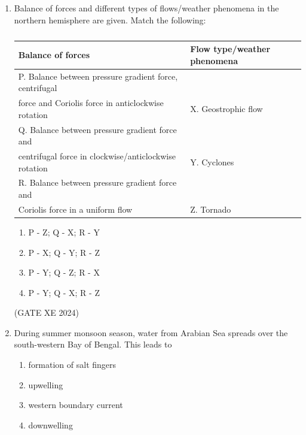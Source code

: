 \documentclass[12pt]{article}
\begin{document}
\begin{enumerate}
\begin{enumerate}
\item The lapse rate of environment below 5 km is -15 $^\circ$C km$^{-1}$  
\item The atmosphere is unstable above 5 km  
\item The chances of a deep convective cloud growth above 5 km are less  
\item The atmosphere is conditionally unstable below 5 km  
\end{enumerate}

(GATE XE 2024)

\item Balance of forces and different types of flows/weather phenomena in the northern hemisphere are given. Match the following:

\begin{table}[H]
\centering
\begin{tabular}{|l|l|}
\hline
\textbf{Balance of forces} & \textbf{Flow type/weather phenomena} \\
\hline
P. Balance between pressure gradient force, centrifugal & \\
force and Coriolis force in anticlockwise rotation & X. Geostrophic flow \\
\hline
Q. Balance between pressure gradient force and & \\
centrifugal force in clockwise/anticlockwise rotation & Y. Cyclones \\
\hline
R. Balance between pressure gradient force and & \\
Coriolis force in a uniform flow & Z. Tornado \\
\hline
\end{tabular}
\caption{}
\label{}
\end{table}

\begin{enumerate}
\item P - Z; Q - X; R - Y
\item P - X; Q - Y; R - Z
\item P - Y; Q - Z; R - X
\item P - Y; Q - X; R - Z
\end{enumerate}

(GATE XE 2024)

\item During summer monsoon season, water from Arabian Sea spreads over the south-western Bay of Bengal.  
This leads to  

\begin{enumerate}
\item formation of salt fingers  
\item upwelling  
\item western boundary current  
\item downwelling  
\end{enumerate}


\end{enumerate}
\end{document}
